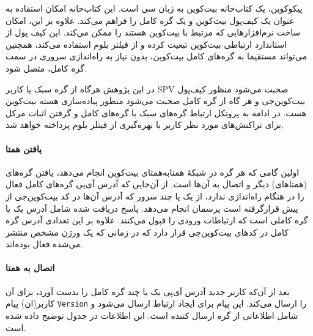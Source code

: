   پیکوکوین،‌ یک کتاب‌خانه بیت‌کوین به زبان سی است. این کتاب‌خانه امکان استفاده به عنوان یک کیف‌پول بیت‌کوین و یک گره کامل را فراهم می‌کند. علاوه بر این، امکان ساخت نرم‌افزارهایی که مرتبط با بیت‌کوین هستند را ممکن می‌کند. این کیف پول از استاندارد ارتباطی بیت‌کوین تبعیت کرده و از فیلتر بلوم استفاده می‌کند، همچنین می‌تواند مستقیما به گره‌های کامل بیت‌کوین، بدون نیاز به راه‌اندازی سروری در سمت گره کامل، متصل شود.
  
  در این پژوهش هرگاه از گره سبک یا کاربر SPV صحبت می‌شود منظور کیف‌پول بیت‌کوین‌جی \cite{bitcoinj} و هر گاه از گره کامل صحبت می‌شود منظور پیاده‌سازی هسته بیت‌کوین \cite{Bitcoincore.org} هست. در ادامه به پروتکل ارتباط گره‌های سبک با گره‌های کامل و گرفتن اثبات مرکل  برای تراکنش‌های مورد نظر کاربر با بهره‌گیری از فیتلر بلوم پرداخته خواهد شد. 
  
\paragraph{یافتن همتا}

  اولین گامی که هر گره در شبکهٔ همتا‌به‌همتای بیت‌کوین انجام می‌دهد، یافتن گره‌های (همتا‌های) دیگر و اتصال به آن‌ها است. از آن‌جایی که آدرس آی‌پی گره‌های کامل فعال را در هنگام راه‌اندازی ندارد، از یک یا چند سرور 
 که آدرس‌ آن‌ها در کد بیت‌کوین‌جی از پیش قرارگرفته است پرسمان انجام می‌دهد. پاسخ دریافت شده شامل آدرس یک یا گره کاملی است که ارتباطات ورودی را قبول می‌کنند. علاوه بر این تعدادی آدرس گره کامل در کدهای بیت‌کوین‌جی قرار دارد که در زمانی که یک ورژن مشخص منتشر می‌شده فعال بوده‌اند. 
 \paragraph{اتصال به همتا}
 بعد از آن‌که کاربر جدید آدرس آی‌پی یک یا چند گره کامل را بدست آورد، برای آن کاربر(ان) پیام \texttt{Version} را ارسال می‌کند. این پیام برای ایجاد ارتباط ارسال می‌شود و شامل اطلاعاتی از گره ارسال کننده است. این اطلاعات در جدول  توضیح داده شده است.

